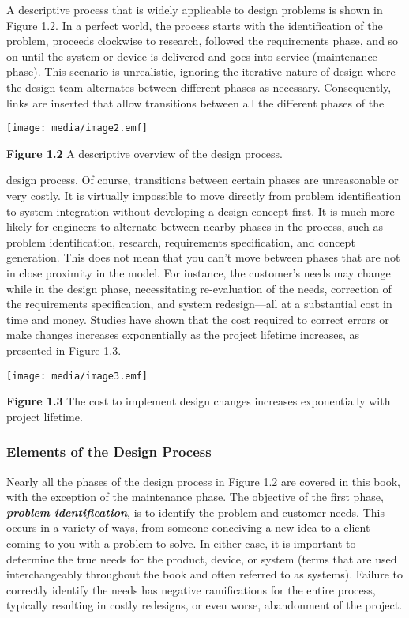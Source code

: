 A descriptive process that is widely applicable to design problems is
shown in Figure 1.2. In a perfect world, the process starts with the
identification of the problem, proceeds clockwise to research, followed
the requirements phase, and so on until the system or device is
delivered and goes into service (maintenance phase). This scenario is
unrealistic, ignoring the iterative nature of design where the design
team alternates between different phases as necessary. Consequently,
links are inserted that allow transitions between all the different
phases of the

\texttt{[image: media/image2.emf]}

\textbf{Figure 1.2} A descriptive overview of the design process.

design process. Of course, transitions between certain phases are
unreasonable or very costly. It is virtually impossible to move directly
from problem identification to system integration without developing a
design concept first. It is much more likely for engineers to alternate
between nearby phases in the process, such as problem identification,
research, requirements specification, and concept generation. This does
not mean that you can't move between phases that are not in close
proximity in the model. For instance, the customer's needs may change
while in the design phase, necessitating re-evaluation of the needs,
correction of the requirements specification, and system redesign---all
at a substantial cost in time and money. Studies have shown that the
cost required to correct errors or make changes increases exponentially
as the project lifetime increases, as presented in Figure 1.3.

\texttt{[image: media/image3.emf]}

\textbf{Figure 1.3} The cost to implement design changes increases
exponentially with project lifetime.

\subsubsection{Elements of the Design
Process}\label{elements-of-the-design-process}

Nearly all the phases of the design process in Figure 1.2 are covered in
this book, with the exception of the maintenance phase. The objective of
the first phase, \emph{\textbf{problem identification}}, is to identify
the problem and customer needs. This occurs in a variety of ways, from
someone conceiving a new idea to a client coming to you with a problem
to solve. In either case, it is important to determine the true needs
for the product, device, or system (terms that are used interchangeably
throughout the book and often referred to as systems). Failure to
correctly identify the needs has negative ramifications for the entire
process, typically resulting in costly redesigns, or even worse,
abandonment of the project.

